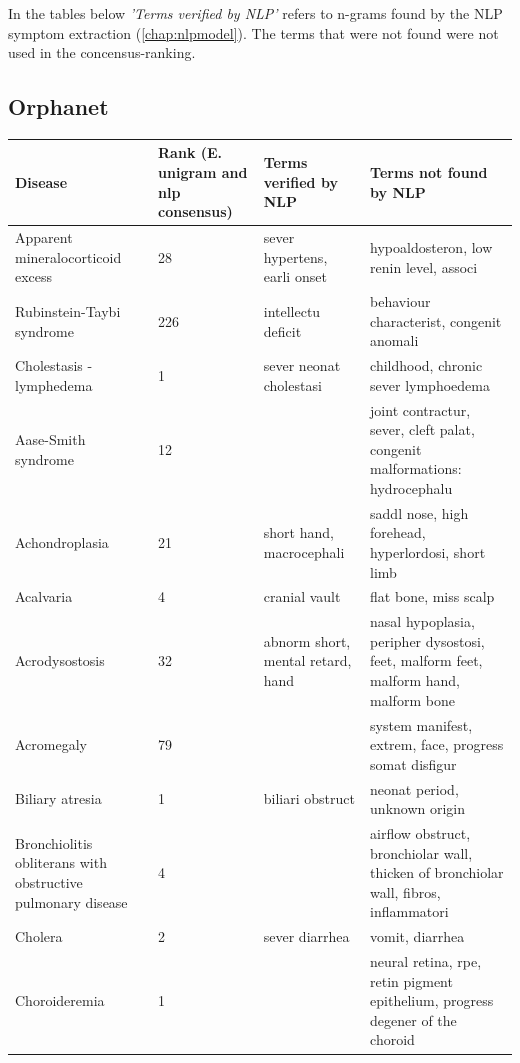 \documentclass[10pt,letterpaper,two column,final]{article}
\begin{document}
In the tables below \textit{'Terms verified by NLP'} refers to n-grams found by the NLP symptom extraction (\ref{chap:nlpmodel}). The terms that were not found were not used in the concensus-ranking.

\subsection{Orphanet}
\label{app:orphanet_tfidf_tfidfrecalc}
\begin{center}
\begin{small}
	\begin{longtable}{|p{3.5cm}|p{1.5cm}|p{3cm}|p{3cm}|}
	\hline
	\textbf{Disease}  & \textbf{Rank (E. unigram and nlp consensus)} & \textbf{Terms verified by NLP}  & \textbf{Terms not found by NLP} \\
	\hline\hline
Apparent mineralocorticoid excess & 28 & sever hypertens, earli onset & hypoaldosteron, low renin level, associ \\ \hline
Rubinstein-Taybi syndrome & 226 & intellectu deficit & behaviour characterist, congenit anomali \\ \hline
Cholestasis - lymphedema & 1 & sever neonat cholestasi &  childhood, chronic sever lymphoedema \\ \hline
Aase-Smith syndrome & 12 &   & joint contractur, sever, cleft palat, congenit malformations: hydrocephalu \\ \hline
Achondroplasia & 21 & short hand, macrocephali & saddl nose, high forehead, hyperlordosi, short limb \\ \hline
Acalvaria & 4 & cranial vault &  flat bone, miss scalp \\ \hline
Acrodysostosis & 32 & abnorm short, mental retard, hand & nasal hypoplasia, peripher dysostosi, feet, malform feet, malform hand, malform bone \\ \hline
Acromegaly & 79 &  & system manifest, extrem, face, progress somat disfigur \\ \hline
Biliary atresia & 1 & biliari obstruct &  neonat period, unknown origin \\ \hline
Bronchiolitis obliterans with obstructive pulmonary disease & 4 &  &  airflow obstruct, bronchiolar wall, thicken of bronchiolar wall, fibros, inflammatori \\ \hline
Cholera & 2 & sever diarrhea &  vomit, diarrhea  \\ \hline
Choroideremia & 1 &  &  neural retina, rpe, retin pigment epithelium, progress degener of the choroid \\ \hline

\end{longtable}
\end{small}
\end{center}
\end{document}
